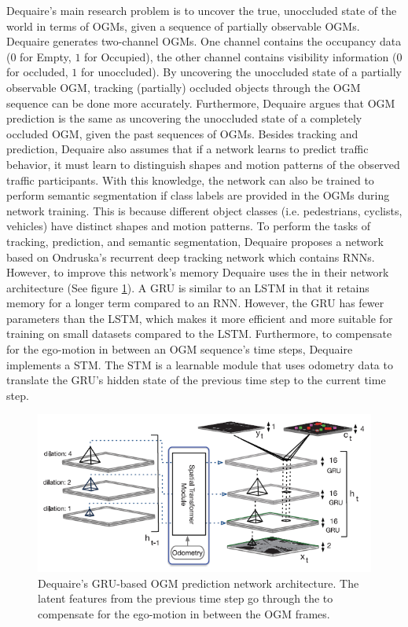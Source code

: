 Dequaire's \cite{dequaire2018deep} main research problem is to uncover the true, unoccluded state of the world in terms of \glspl{OGM}, given a sequence of partially observable \glspl{OGM}. Dequaire \cite{dequaire2018deep} generates two-channel \glspl{OGM}. One channel contains the occupancy data ($0$ for Empty, $1$ for Occupied), the other channel contains visibility information ($0$ for occluded, $1$ for unoccluded). By uncovering the unoccluded state of a partially observable \gls{OGM}, tracking (partially) occluded objects through the \gls{OGM} sequence can be done more accurately. Furthermore, Dequaire \cite{dequaire2018deep} argues that \gls{OGM} prediction is the same as uncovering the unoccluded state of a completely occluded \gls{OGM}, given the past sequences of \glspl{OGM}. Besides tracking and prediction, Dequaire \cite{dequaire2018deep} also assumes that if a network learns to predict traffic behavior, it must learn to distinguish shapes and motion patterns of the observed traffic participants. With this knowledge, the network can also be trained to perform semantic segmentation if class labels are provided in the \glspl{OGM} during network training. This is because different object classes (i.e. pedestrians, cyclists, vehicles) have distinct shapes and motion patterns. To perform the tasks of tracking, prediction, and semantic segmentation, Dequaire \cite{dequaire2018deep} proposes a network based on Ondruska's \cite{ondruska2016deep} recurrent deep tracking network which contains \glspl{RNN}. However, to improve this network's memory Dequaire \cite{dequaire2018deep} uses the  in their network architecture (See figure \ref{fig:gru_dequaire}). A \gls{GRU} is similar to an \gls{LSTM} in that it retains memory for a longer term compared to an \gls{RNN}. However, the \gls{GRU} has fewer parameters than the \gls{LSTM}, which makes it more efficient and more suitable for training on small datasets compared to the \gls{LSTM}. Furthermore, to compensate for the ego-motion in between an \gls{OGM} sequence's time steps, Dequaire \cite{dequaire2018deep} implements a \gls{STM}. The \gls{STM} is a learnable module that uses odometry data to translate the \gls{GRU}'s hidden state of the previous time step to the current time step. \\

\begin{figure}[h]
	\centering
	\includegraphics[width=0.8\linewidth]{Figures/Methods/Dequaire_GRU}
	\caption{Dequaire's \cite{dequaire2018deep} \gls{GRU}-based \gls{OGM} prediction network architecture. The latent features from the previous time step go through the  to compensate for the ego-motion in between the \gls{OGM} frames.}
	\label{fig:gru_dequaire}
\end{figure}

